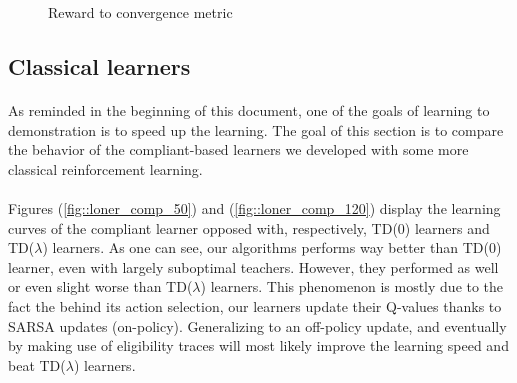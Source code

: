 \documentclass[a4paper]{report}
\begin{document}
{{{{\begin{figure}[h!]
\begin{minipage}{0.5\linewidth}
						\caption{Reward to convergence metric}
						\label{fig::metric_tr}
					\end{minipage}
				\end{figure}	
			}
		}
		\subsection{Classical learners}
		{
			\paragraph{} As reminded in the beginning of this document, one of the goals of learning to demonstration is to speed up the learning. The goal of this section is to compare the behavior of the compliant-based learners we developed with some more classical reinforcement learning. 
			
			\paragraph{} Figures (\ref{fig::loner_comp_50}) and (\ref{fig::loner_comp_120}) display the learning curves of the compliant learner opposed with, respectively, TD(0) learners and TD($\lambda$) learners. As one can see, our algorithms performs way better than TD(0) learner, even with largely suboptimal teachers. However, they performed as well or even slight worse than TD($\lambda$) learners. This phenomenon is mostly due to the fact the behind its action selection, our learners update their Q-values thanks to SARSA updates (on-policy). Generalizing to an off-policy update, and eventually by making use of eligibility traces will most likely improve the learning speed and beat TD($\lambda$) learners. 
							
}}}
\end{document}
